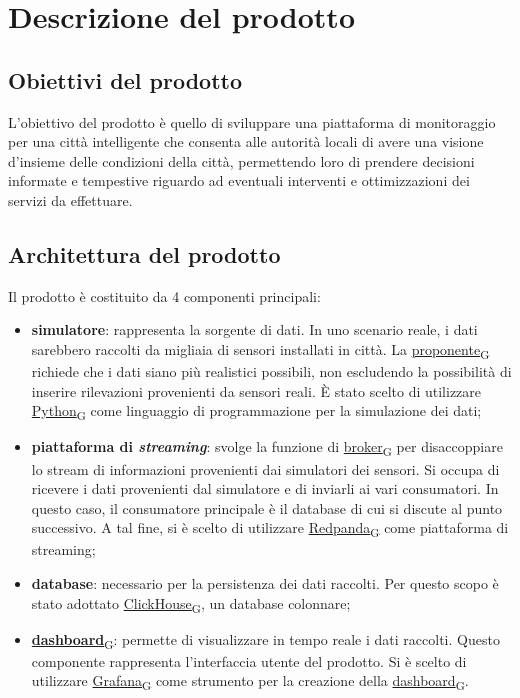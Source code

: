 \section{Descrizione del prodotto}
\subsection{Obiettivi del prodotto}
L'obiettivo del prodotto è quello di sviluppare una piattaforma di monitoraggio per una città intelligente che consenta alle autorità locali di avere una visione d'insieme delle condizioni della città, permettendo loro di prendere decisioni informate e tempestive riguardo ad eventuali interventi e ottimizzazioni dei servizi da effettuare.

\subsection{Architettura del prodotto}
Il prodotto è costituito da 4 componenti principali:
\begin{itemize}
	\item \textbf{simulatore}: rappresenta la sorgente di dati. In uno scenario reale, i dati sarebbero raccolti da migliaia di sensori
	      installati in città. La \href{https://7last.github.io/docs/rtb/documentazione-interna/glossario\#proponente}{proponente\textsubscript{G}} richiede che i dati siano più realistici possibili, non escludendo la possibilità di inserire rilevazioni provenienti da sensori reali.
	      È stato scelto di utilizzare \href{https://7last.github.io/docs/rtb/documentazione-interna/glossario\#python}{Python\textsubscript{G}} come linguaggio di programmazione per la simulazione dei dati;
	\item \textbf{piattaforma di \textit{streaming}}: svolge la funzione di \href{https://7last.github.io/docs/rtb/documentazione-interna/glossario\#broker}{broker\textsubscript{G}} per disaccoppiare lo stream di informazioni provenienti dai simulatori dei sensori.
	      Si occupa di ricevere i dati provenienti dal simulatore e di inviarli ai vari consumatori. In questo caso, il consumatore principale è il database
	      di cui si discute al punto successivo.
	      A tal fine, si è scelto di utilizzare \href{https://7last.github.io/docs/rtb/documentazione-interna/glossario\#Redpanda}{Redpanda\textsubscript{G}} come piattaforma di streaming;
	\item \textbf{database}: necessario per la persistenza dei dati raccolti. Per questo scopo è stato adottato \href{https://7last.github.io/docs/rtb/documentazione-interna/glossario\#clickhouse}{ClickHouse\textsubscript{G}}, un database colonnare;
	\item \href{https://7last.github.io/docs/rtb/documentazione-interna/glossario\#dashboard}{\textbf{dashboard}\textsubscript{G}}: permette di visualizzare in tempo reale i dati raccolti. Questo componente rappresenta l'interfaccia utente del prodotto.
	      Si è scelto di utilizzare \href{https://7last.github.io/docs/rtb/documentazione-interna/glossario\#grafana}{Grafana\textsubscript{G}} come strumento per la creazione della \href{https://7last.github.io/docs/rtb/documentazione-interna/glossario\#dashboard}{dashboard\textsubscript{G}}.
\end{itemize}

